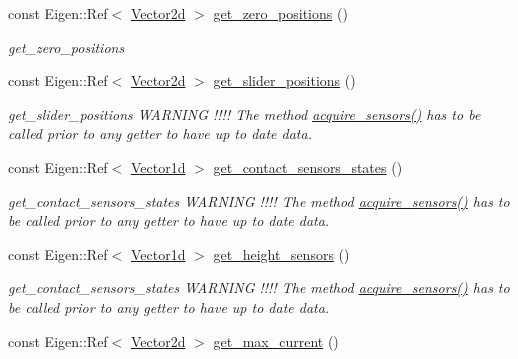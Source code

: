 \begin{DoxyCompactItemize}
const Eigen\+::\+Ref$<$ \hyperlink{common__header_8hpp_acb6916bc8c9fe9d98c484fd4cc201447}{Vector2d} $>$ \hyperlink{classblmc__robots_1_1Teststand_adbceb17de729cced8e9985b9177efa7c}{get\+\_\+zero\+\_\+positions} ()
\begin{DoxyCompactList}\small\item\em get\+\_\+zero\+\_\+positions \end{DoxyCompactList}\item 
const Eigen\+::\+Ref$<$ \hyperlink{common__header_8hpp_acb6916bc8c9fe9d98c484fd4cc201447}{Vector2d} $>$ \hyperlink{classblmc__robots_1_1Teststand_af46acfc1bd408d40b850c4780e834f53}{get\+\_\+slider\+\_\+positions} ()
\begin{DoxyCompactList}\small\item\em get\+\_\+slider\+\_\+positions W\+A\+R\+N\+I\+NG !!!! The method \hyperlink{classblmc__robots_1_1Teststand_a4203e25148ab5b4ddfef3b46647213c6}{acquire\+\_\+sensors()} has to be called prior to any getter to have up to date data. \end{DoxyCompactList}\item 
const Eigen\+::\+Ref$<$ \hyperlink{common__header_8hpp_a932c1319d78144ebcaa8938ae070b784}{Vector1d} $>$ \hyperlink{classblmc__robots_1_1Teststand_a0486afbd05d4f7c354ebad8432c178bd}{get\+\_\+contact\+\_\+sensors\+\_\+states} ()
\begin{DoxyCompactList}\small\item\em get\+\_\+contact\+\_\+sensors\+\_\+states W\+A\+R\+N\+I\+NG !!!! The method \hyperlink{classblmc__robots_1_1Teststand_a4203e25148ab5b4ddfef3b46647213c6}{acquire\+\_\+sensors()} has to be called prior to any getter to have up to date data. \end{DoxyCompactList}\item 
const Eigen\+::\+Ref$<$ \hyperlink{common__header_8hpp_a932c1319d78144ebcaa8938ae070b784}{Vector1d} $>$ \hyperlink{classblmc__robots_1_1Teststand_af8a0d1cc608f91a0a752758c7554087a}{get\+\_\+height\+\_\+sensors} ()
\begin{DoxyCompactList}\small\item\em get\+\_\+contact\+\_\+sensors\+\_\+states W\+A\+R\+N\+I\+NG !!!! The method \hyperlink{classblmc__robots_1_1Teststand_a4203e25148ab5b4ddfef3b46647213c6}{acquire\+\_\+sensors()} has to be called prior to any getter to have up to date data. \end{DoxyCompactList}\item 
const Eigen\+::\+Ref$<$ \hyperlink{common__header_8hpp_acb6916bc8c9fe9d98c484fd4cc201447}{Vector2d} $>$ \hyperlink{classblmc__robots_1_1Teststand_a2f912631ee055e3909ef1a5e06d8d27c}{get\+\_\+max\+\_\+current} ()

\end{DoxyCompactItemize}
